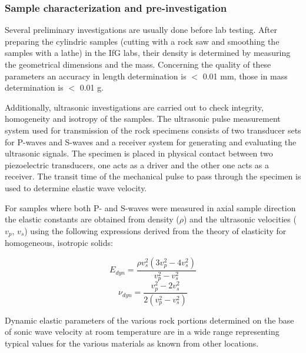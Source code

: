 \subsubsection{Sample characterization and pre-investigation}

Several preliminary investigations are usually done before lab testing. After preparing the cylindric samples (cutting with a rock saw and smoothing the samples with a lathe) in the IfG labs, their density is determined by measuring the geometrical dimensions and the mass. Concerning the quality of these parameters an accuracy in length determination is $<$ 0.01 mm, those in mass determination is $<$ 0.01 g. 

Additionally, ultrasonic investigations are carried out to check integrity, homogeneity and isotropy of the samples. The ultrasonic pulse measurement system used for transmission of the rock specimens consists of two transducer sets for P-waves and S-waves and a receiver system for generating and evaluating the ultrasonic signals. The specimen is placed in physical contact between two piezoelectric transducers, one acts as a driver and the other one acts as a receiver. The transit time of the mechanical pulse to pass through the specimen is used to determine elastic wave velocity.

For samples where both P- and S-waves were measured in axial sample direction the elastic constants are obtained from density ($\rho$) and the ultrasonic velocities ($v_p$, $v_s$) using the following expressions derived from the theory of elasticity for homogeneous, isotropic solids:

\begin{equation}
\label{eq:YoungsModulus_Ultrasonic}
E_{dyn} = \frac{\rho v_s^2(3v_p^2-4v_s^2)}{v_p^2-v_s^2} 
\end{equation}
\begin{equation}
\label{eq:PoissonsRatio_Ultrasonic}
\nu_{dyn} = \frac{v_p^2-2v_s^2}{2(v_p^2-v_s^2)}
\end{equation}

Dynamic elastic parameters of the various rock portions determined on the base of sonic wave velocity at room temperature are in a wide range representing typical values for the various materials as known from other locations. 

